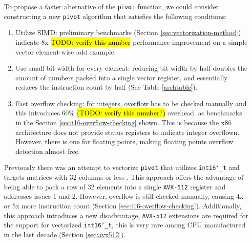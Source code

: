 \documentclass[logo,bsc,singlespacing,parskip]{infthesis}
\newcommand{\dtshort}{\texttt{int16\char`_t}}
\begin{document}
To propose a faster alternative of the \texttt{pivot} function, we could
consider constructing a new \texttt{pivot} algorithm that satisfies the
following conditions:
\begin{enumerate}

\item Utilize SIMD: preliminary benchmarks (Section
\ref{sec:vectorization-method}) indicate 8x \hl{TODO: verify this number}
performance improvement on a simple vector element-wise add example. 

\item Use small bit width for every element: reducing bit width by half doubles the
amount of numbers packed into a single vector register, and essentially reduces
the instruction count by half (See Table \ref{archtable}). 

\item Fast overflow checking: for integers, overflow has to be checked manually
and this introduces 60\%  \hl{(TODO: verify this number?)} overhead, as
benchmarks in the Section \ref{sec:i16-overflow-checking} shown. This is because
the x86 architecture does not provide status registers to indicate integer
overflown. However, there is one for floating points, making floating points
overflow detection almost free. 

\end{enumerate}


Previously there was an attempt to vectorize \texttt{pivot} that utilizes
\dtshort{} and targets matrices with 32 columns or less \cite{FPL2}. This
approach offers the advantage of being able to pack a row of 32 elements into a
single \texttt{AVX-512} register and addresses issues 1 and 2. However, overflow
is still checked manually, causing 4x or 5x more instruction count (Section
\ref{sec:i16-overflow-checking}). Additionally, this approach introduces a new
disadvantage, \texttt{AVX-512} extensions are required for the support for
vectorized \dtshort{}, this is very rare among CPU manufactured in the last
decade (Section \ref{sec:avx512}). 
\end{document}
